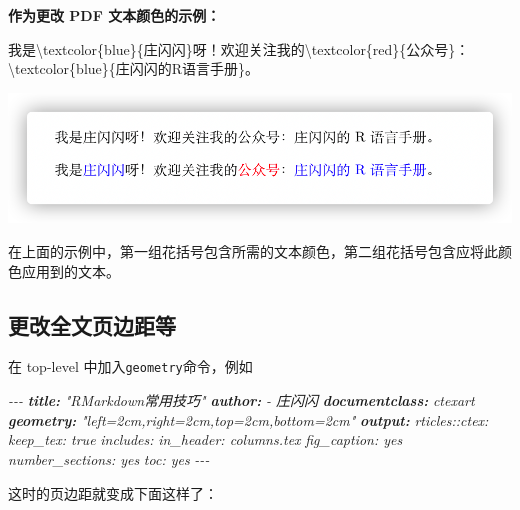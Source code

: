 \documentclass[
]{book}
\newenvironment{Shaded}{\begin{snugshade}}{\end{snugshade}}
\newcommand{\AnnotationTok}[1]{\textcolor[rgb]{0.56,0.35,0.01}{\textbf{\textit{#1}}}}
\newcommand{\CommentTok}[1]{\textcolor[rgb]{0.56,0.35,0.01}{\textit{#1}}}
\newcommand{\NormalTok}[1]{#1}
\begin{document}
\textbf{作为更改 PDF 文本颜色的示例：}

\begin{Shaded}
\begin{Highlighting}[]
\NormalTok{我是\textbackslash{}textcolor\{blue\}\{庄闪闪\}呀！欢迎关注我的\textbackslash{}textcolor\{red\}\{公众号\}：\textbackslash{}textcolor\{blue\}\{庄闪闪的R语言手册\}。}
\end{Highlighting}
\end{Shaded}

\includegraphics{images/paste-E2A98278.png}

在上面的示例中，第一组花括号包含所需的文本颜色，第二组花括号包含应将此颜色应用到的文本。

\hypertarget{ux66f4ux6539ux5168ux6587ux9875ux8fb9ux8dddux7b49}{%
\subsection{更改全文页边距等}\label{ux66f4ux6539ux5168ux6587ux9875ux8fb9ux8dddux7b49}}

在 top-level 中加入\texttt{geometry}命令，例如

\begin{Shaded}
\begin{Highlighting}[]
\CommentTok{{-}{-}{-}}
\AnnotationTok{title:}\CommentTok{ "RMarkdown常用技巧"}
\AnnotationTok{author:}
\CommentTok{  {-} 庄闪闪}
\AnnotationTok{documentclass:}\CommentTok{ ctexart}
\AnnotationTok{geometry:}\CommentTok{ "left=2cm,right=2cm,top=2cm,bottom=2cm"}
\AnnotationTok{output:}
\CommentTok{  rticles::ctex:}
\CommentTok{    keep\_tex: true}
\CommentTok{    includes:}
\CommentTok{      in\_header: columns.tex}
\CommentTok{    fig\_caption: yes}
\CommentTok{    number\_sections: yes}
\CommentTok{    toc: yes}
\CommentTok{{-}{-}{-}}
\end{Highlighting}
\end{Shaded}

这时的页边距就变成下面这样了：
\end{document}
